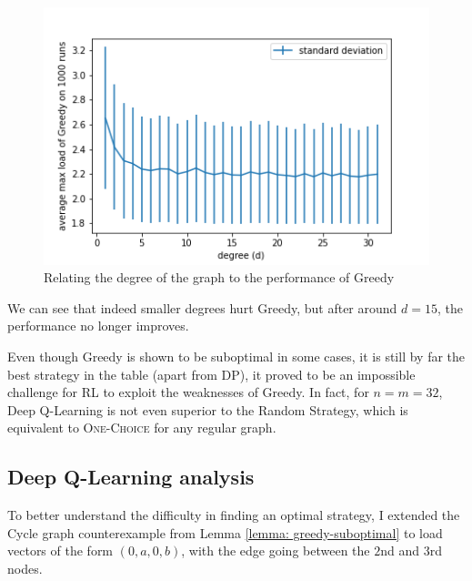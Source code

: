 \begin{figure}[h!] \label{greedy-random-regular-analysis}
    \centering
    \includegraphics[scale=1.0]{Chapter4/Figs/Greedy_degree_analysis.png}
    \caption{Relating the degree of the graph to the performance of Greedy}
\end{figure}


We can see that indeed smaller degrees hurt Greedy, but after around $d=15$, the performance no longer improves. 



Even though Greedy is shown to be suboptimal in some cases, it is still by far the best strategy in the table (apart from DP), it proved to be an impossible challenge for RL to exploit the weaknesses of Greedy. In fact, for $n=m=32$, Deep Q-Learning is not even superior to the Random Strategy, which is equivalent to \textsc{One-Choice} for any regular graph.


\subsection{Deep Q-Learning analysis}

To better understand the difficulty in finding an optimal strategy, I extended the Cycle graph counterexample from Lemma \ref{lemma: greedy-suboptimal} to load vectors of the form $(0, a, 0, b)$, with the edge going between the $2$nd and $3$rd nodes. 


